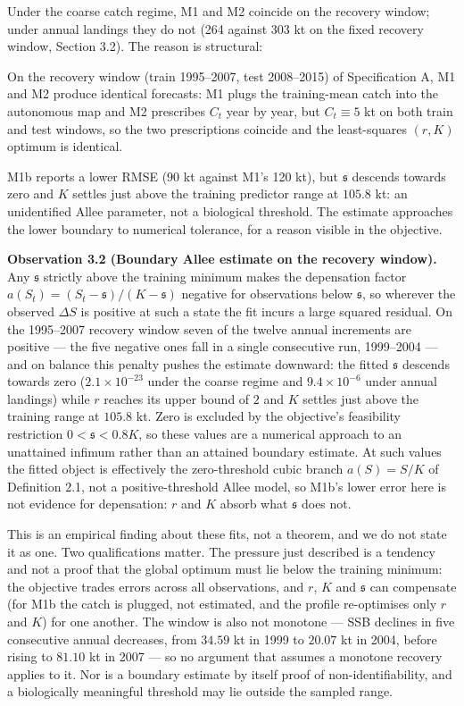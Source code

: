 \documentclass[11pt]{article}
\begin{document}
Under the coarse catch regime, M1 and M2 coincide on the recovery
window; under annual landings they do not (264 against 303 kt on the fixed recovery window, Section 3.2). The reason is structural:

On the recovery window (train 1995--2007, test 2008--2015) of
Specification A, M1 and M2 produce identical forecasts: M1 plugs the
training-mean catch into the autonomous map and M2 prescribes \(C_t\)
year by year, but \(C_t\equiv 5\) kt on both train and test windows, so
the two prescriptions coincide and the least-squares \((r,K)\) optimum is
identical.

M1b reports a lower RMSE (90 kt against M1's 120 kt), but
\(\mathfrak s\) descends towards zero and \(K\) settles just above the
training predictor range at \(105.8\) kt: an
unidentified Allee parameter, not a biological threshold. The estimate
approaches the lower boundary to numerical tolerance, for a reason visible in the objective.

\textbf{Observation 3.2 (Boundary Allee estimate on the recovery
window).} Any \(\mathfrak s\) strictly above the training minimum makes
the depensation factor
\(a(S_t)=(S_t-\mathfrak s)/(K-\mathfrak s)\) negative for observations
below \(\mathfrak s\), so wherever the observed \(\Delta S\) is positive
at such a state the fit incurs a large squared residual. On the
1995--2007 recovery window seven of the twelve annual increments are
positive --- the five negative ones fall in a single consecutive run,
1999--2004 --- and on balance this penalty pushes the estimate downward: the fitted \(\mathfrak s\)
descends towards zero (\(2.1\times10^{-23}\) under the coarse regime and
\(9.4\times10^{-6}\) under annual landings) while \(r\) reaches its
upper bound of \(2\) and \(K\) settles just above the training range at
\(105.8\) kt. Zero is excluded by the objective's feasibility
restriction \(0 < \mathfrak s < 0.8K\), so these values are a numerical
approach to an unattained infimum rather than an attained boundary
estimate. At such values the fitted object is effectively the
zero-threshold cubic branch \(a(S)=S/K\) of Definition 2.1, not a
positive-threshold Allee model, so M1b's lower error here is not
evidence for depensation: \(r\) and \(K\) absorb what \(\mathfrak s\)
does not.

This is an empirical finding about these fits, not a theorem, and we do
not state it as one. Two qualifications matter. The pressure just
described is a tendency and not a proof that the global optimum must lie
below the training minimum: the objective trades errors across all
observations, and \(r\), \(K\) and \(\mathfrak s\) can compensate (for M1b the catch is
plugged, not estimated, and the profile re-optimises only \(r\) and
\(K\))
for one another. The window is also not monotone --- SSB declines in
five consecutive annual decreases, from \(34.59\) kt in 1999 to
\(20.07\) kt in 2004, before rising to \(81.10\) kt in 2007 --- so no argument that
assumes a monotone recovery applies to it. Nor is a boundary estimate by
itself proof of non-identifiability, and a biologically meaningful
threshold may lie outside the sampled range.
\end{document}
